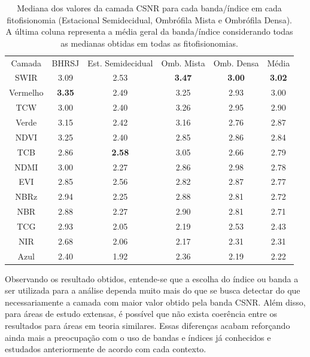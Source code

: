 \begin{table}[h!]
    \centering
    \begin{tabular}{| c | c | c | c| c | c |}
    \hline
            Camada & BHRSJ & Est. Semidecidual & Omb. Mista & Omb. Densa & Média \\
            SWIR & 3.09 & 2.53 & \textbf{3.47} & \textbf{3.00} & \textbf{3.02} \\
            Vermelho & \textbf{3.35} & 2.49 & 3.25 & 2.93 & 3.00 \\
            TCW & 3.00 & 2.40 & 3.26 & 2.95 & 2.90 \\
            Verde & 3.15 & 2.42 & 3.16 & 2.76 & 2.87 \\
            NDVI & 3.25 & 2.40 & 2.85 & 2.86 & 2.84 \\
            TCB & 2.86 & \textbf{2.58} & 3.05 & 2.66 & 2.79 \\
            NDMI & 3.00 & 2.27 & 2.86 & 2.98 & 2.78 \\
            EVI & 2.85 & 2.56 & 2.82 & 2.87 & 2.77 \\
            NBRz & 2.94 & 2.25 & 2.88 & 2.81 & 2.72 \\
            NBR & 2.88 & 2.27 & 2.90 & 2.81 & 2.71 \\
            TCG & 2.93 & 2.05 & 2.19 & 2.53 & 2.43 \\
            NIR & 2.68 & 2.06 & 2.17 & 2.31 & 2.31 \\
            Azul & 2.40 & 1.92 & 2.36 & 2.19 & 2.22 \\
    \hline
    \end{tabular}
    \caption{Mediana dos valores da camada CSNR para cada banda/índice em cada fitofisionomia (Estacional Semidecidual, Ombrófila Mista e Ombrófila Densa). A última coluna representa a média geral da banda/índice considerando todas as medianas obtidas em todas as fitofisionomias.}
    \label{tab:csnr_results_com_bhrsj}
\end{table}

Observando os resultado obtidos, entende-se que a escolha do índice ou banda a ser utilizada para a análise dependa muito mais do que se busca detectar do que necessariamente a camada com maior valor obtido pela banda CSNR. Além disso, para áreas de estudo extensas, é possível que não exista coerência entre os resultados para áreas em teoria similares. Essas diferenças acabam reforçando ainda mais a preocupação com o uso de bandas e índices já conhecidos e estudados anteriormente de acordo com cada contexto.

